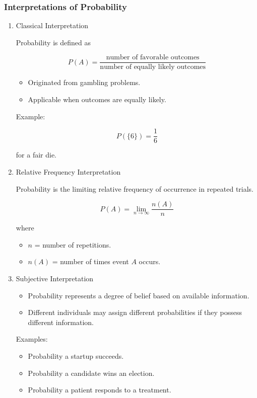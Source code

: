 \documentclass[11pt]{article}
\begin{document}
\subsubsection{Interpretations of Probability}
\label{sec:orgca72181}

\begin{enumerate}
\item Classical Interpretation
\label{sec:org5e1de70}

Probability is defined as

\[
P(A)=
\frac{\text{number of favorable outcomes}}
     {\text{number of equally likely outcomes}}
\]

\begin{itemize}
\item Originated from gambling problems.
\item Applicable when outcomes are equally likely.
\end{itemize}

Example:

\[
P(\{6\})=\frac{1}{6}
\]

for a fair die.
\item Relative Frequency Interpretation
\label{sec:orgcb8ba7d}

Probability is the limiting relative frequency of occurrence in repeated trials.

\[
P(A)=
\lim_{n\to\infty}
\frac{n(A)}{n}
\]

where

\begin{itemize}
\item \(n\) = number of repetitions.
\item \(n(A)\) = number of times event \(A\) occurs.
\end{itemize}
\item Subjective Interpretation
\label{sec:org6ab1c8d}

\begin{itemize}
\item Probability represents a degree of belief based on available information.
\item Different individuals may assign different probabilities if they possess different information.
\end{itemize}

Examples:

\begin{itemize}
\item Probability a startup succeeds.
\item Probability a candidate wins an election.
\item Probability a patient responds to a treatment.
\end{itemize}
\end{enumerate}
\end{document}
